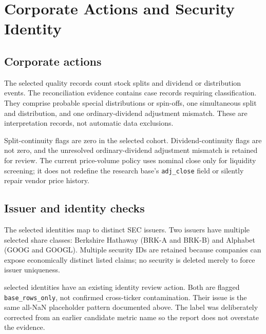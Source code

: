 \section{Corporate Actions and Security Identity}

\subsection{Corporate actions}

The selected quality records count \SplitEvents{} stock splits and
\DividendEvents{} dividend or distribution events. The reconciliation evidence
contains \CorporateActionCaseRecords{} case records requiring classification.
They comprise probable special distributions or spin-offs, one simultaneous
split and distribution, and one ordinary-dividend adjustment mismatch. These
are interpretation records, not automatic data exclusions.

\begin{table}[H]
\centering
\caption{Corporate-action evidence retained after filtering}
\label{tab:corporate-actions}
\end{table}

Split-continuity flags are zero in the selected cohort. Dividend-continuity
flags are not zero, and the unresolved ordinary-dividend adjustment mismatch is
retained for review. The current price-volume policy uses nominal close only
for liquidity screening; it does not redefine the research base's
\texttt{adj\_close} field or silently repair vendor price history.

\subsection{Issuer and identity checks}

The \SelectedSecurities{} selected identities map to \SelectedIssuers{}
distinct SEC issuers. Two issuers have multiple selected share classes:
Berkshire Hathaway (BRK-A and BRK-B) and Alphabet (GOOG and GOOGL). Multiple
security IDs are retained because companies can expose economically distinct
listed claims; no security is deleted merely to force issuer uniqueness.

\begin{table}[H]
\centering
\caption{Selected issuers with multiple security identities}
\label{tab:multi-issuer}
\end{table}

\IdentityReviewCandidates{} selected identities have an existing identity
review action. Both are flagged \texttt{base\_rows\_only}, not confirmed
cross-ticker contamination. Their issue is the same all-NaN placeholder
pattern documented above. The label was deliberately corrected from an earlier
candidate metric name so the report does not overstate the evidence.
\begin{table}[H]
\centering
\caption{Selected identity review candidates}
\label{tab:identity-review}
\end{table}

